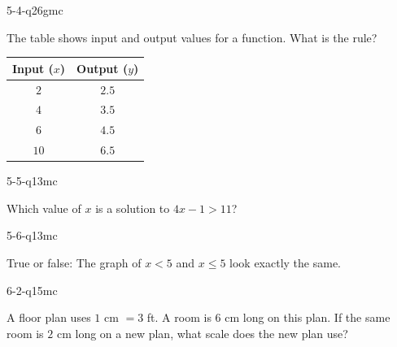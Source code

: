 \begin{practiceQuestion}{5-4-q26}{gmc}
\begin{questionText}
The table shows input and output values for a function. What is the rule?

\begin{center}
\begin{tabular}{|c|c|}
\hline
\textbf{Input ($x$)} & \textbf{Output ($y$)} \\
\hline
$2$ & $2.5$ \\
\hline
$4$ & $3.5$ \\
\hline
$6$ & $4.5$ \\
\hline
$10$ & $6.5$ \\
\hline
\end{tabular}
\end{center}
\end{questionText}
\end{practiceQuestion}

\begin{practiceQuestion}{5-5-q13}{mc}
\begin{questionText}
Which value of $x$ is a solution to $4x - 1 > 11$?
\end{questionText}
\end{practiceQuestion}

\begin{practiceQuestion}{5-6-q13}{mc}
\begin{questionText}
True or false: The graph of $x < 5$ and $x \leq 5$ look exactly the same.
\end{questionText}
\end{practiceQuestion}

\begin{practiceQuestion}{6-2-q15}{mc}
\begin{questionText}
A floor plan uses $1$ cm $= 3$ ft. A room is $6$ cm long on this plan. If the same room is $2$ cm long on a new plan, what scale does the new plan use?
\end{questionText}
\end{practiceQuestion}

